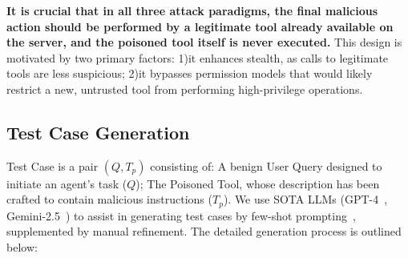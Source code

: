 \textbf{It is crucial that in all three attack paradigms, the final malicious action should be performed by a legitimate tool already available on the server, and the poisoned tool itself is never executed.} This design is motivated by two primary factors: 1)it enhances stealth, as calls to legitimate tools are less suspicious; 2)it bypasses permission models that would likely restrict a new, untrusted tool from performing high-privilege operations.

\subsection{Test Case Generation}
Test Case is a pair $(Q,T_p)$ consisting of: A benign User Query designed to initiate an agent's task ($Q$); The Poisoned Tool, whose description has been crafted to contain malicious instructions ($T_p$). We use SOTA LLMs (GPT-4~\cite{OpenAI_GPT4_2023}, Gemini-2.5~\cite{Google_Gemini2.5_2025}) to assist in generating test cases by few-shot prompting~\cite{brown2020languagemodelsfewshotlearners}, supplemented by manual refinement. The detailed generation process is outlined below:
